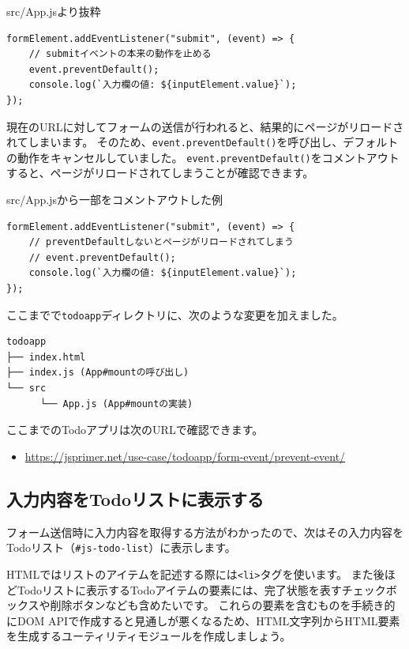 \begin{listtitle}
src/App.jsより抜粋
\end{listtitle}
\begin{lstlisting}
formElement.addEventListener("submit", (event) => {
    // submitイベントの本来の動作を止める
    event.preventDefault();
    console.log(`入力欄の値: ${inputElement.value}`);
});
\end{lstlisting}
\listend

現在のURLに対してフォームの送信が行われると、結果的にページがリロードされてしまいます。
そのため、\texttt{event.preventDefault()}を呼び出し、デフォルトの動作をキャンセルしていました。
\texttt{event.preventDefault()}をコメントアウトすると、ページがリロードされてしまうことが確認できます。

\begin{listtitle}
src/App.jsから一部をコメントアウトした例
\end{listtitle}
\begin{lstlisting}
formElement.addEventListener("submit", (event) => {
    // preventDefaultしないとページがリロードされてしまう
    // event.preventDefault();
    console.log(`入力欄の値: ${inputElement.value}`);
});
\end{lstlisting}
\listend

ここまでで\texttt{todoapp}ディレクトリに、次のような変更を加えました。

\begin{lstlisting}
todoapp
├── index.html
├── index.js (App#mountの呼び出し)
└── src
      └── App.js (App#mountの実装)
\end{lstlisting}

ここまでのTodoアプリは次のURLで確認できます。

\begin{itemize}
\item
  \url{https://jsprimer.net/use-case/todoapp/form-event/prevent-event/}
\end{itemize}

\hypertarget{input-to-todolist}{%
\subsection{入力内容をTodoリストに表示する}\label{input-to-todolist}}

フォーム送信時に入力内容を取得する方法がわかったので、次はその入力内容をTodoリスト（\texttt{\#js-todo-list}）に表示します。

HTMLではリストのアイテムを記述する際には\texttt{<li>}タグを使います。
また後ほどTodoリストに表示するTodoアイテムの要素には、完了状態を表すチェックボックスや削除ボタンなども含めたいです。
これらの要素を含むものを手続き的にDOM
APIで作成すると見通しが悪くなるため、HTML文字列からHTML要素を生成するユーティリティモジュールを作成しましょう。

